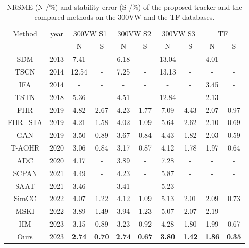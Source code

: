 \documentclass[review]{elsarticle}
\begin{document}
\begin{table}[h]
\centering
\renewcommand\tabcolsep{2.0pt}
\begin{tabular}{*{10}{c}}
	\toprule
	\multirow{2}{*}{Method}&\multirow{2}{*}{year}  &\multicolumn{2}{c}{300VW S1}&\multicolumn{2}{c}{300VW S2}&\multicolumn{2}{c}{300VW S3}
	&\multicolumn{2}{c}{TF}\\\cline{3-10}
	& & N & S &N &S & N & S & N & S \\
	\midrule
	SDM \cite{SDM}&	2013 &7.41&	-&	6.18&	-	&13.04&	-&	4.01&	- \\
	TSCN \cite{TSCN}&2014 &	12.54&	-&	7.25&	-&	13.13&	-&	-&	-\\
	IFA \cite{IFA} & 2014 &	-&	-	&-&	-	&-	&-	&3.45&	-\\
	TSTN \cite{TSTN} & 2018 &	5.36&	-&	4.51&	-	&12.84	&-&	2.13&	-\\
	FHR \cite{tai2018towards}& 2019 &4.82&	2.67&	4.23&	1.77&	7.09&	4.43&	2.07&	0.97\\
	FHR+STA \cite{tai2018towards}& 2019 & 4.21&	1.58&	4.02&	1.09&	5.64&	2.62&	2.10&	0.69\\
	GAN \cite{GAN_Tracking}&	2019 &3.50&	0.89&	3.67&	0.84&	4.43&	1.82&	2.03&	0.59\\
	T-AOHR \cite{AOHR}& 2020 &3.06&	0.84	&3.17&	0.87&	4.12&	1.78	&1.97&	0.64 \\
	ADC \cite{ADC}&2020 &4.17&	-	&3.89&	-&	7.28&	-&	-&	-\\   
	SCPAN \cite{SCPAN}& 2021 & 4.49 & -& 4.23 & -&5.87 & -& -&- \\
	SAAT \cite{SAAT}& 2021 &3.46&	-&	3.41&	-&	5.23&	-&	-&	-\\
	SimCC \cite{SimCC} & 2022 & 4.07&  1.22 & 4.12& 1.09  & 5.13 & 2.01  & 2.09 &  0.73 \\
	MSKI \cite{MSKI} & 2022 & 3.89 & 1.49 & 3.94 & 1.23 & 5.07 &  2.07 & 2.19 & - \\
	HM \cite{HybridMatch} & 2023 & 3.15 &  0.89 & 3.23 &  0.92 & 4.28 &  1.80 & 1.99 &  0.67 \\
	\midrule
	\midrule
	Ours & 2023 &\textbf{2.74}   &  \textbf{0.70} & \textbf{2.74}  & \textbf{0.67}  &  \textbf{3.80}  & \textbf{1.42} & \textbf{1.86}  & \textbf{0.35}\\
	\bottomrule
\end{tabular}
\caption{NRSME (N /\%) and stability error (S /\%) of the proposed tracker and the compared methods on the 300VW and the TF databases.}
\label{tab:cp}
\end{table}
\end{document}

